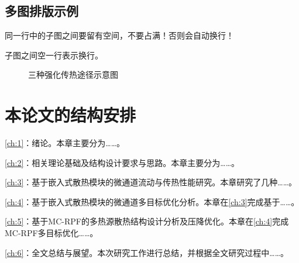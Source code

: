 \subsection{多图排版示例}
同一行中的子图之间要留有空间，不要占满！否则会自动换行！

子图之间空一行表示换行。

\begin{figure}[htb]

    \caption{三种强化传热途径示意图}
    \label{fig:Three-enhanced-heat-transfer-paths}
\end{figure}


\section{本论文的结构安排}
\cref{ch:1}：绪论。本章主要分为……。

\cref{ch:2}：相关理论基础及结构设计要求与思路。本章主要分为……。

\cref{ch:3}：基于嵌入式散热模块的微通道流动与传热性能研究。本章研究了几种……。

\cref{ch:4}：基于嵌入式散热模块的微通道多目标优化分析。本章在\cref{ch:3}完成基于……。

\cref{ch:5}：基于MC-RPF的多热源散热结构设计分析及压降优化。本章在\cref{ch:4}完成MC-RPF多目标优化……。

\cref{ch:6}：全文总结与展望。本次研究工作进行总结，并根据全文研究过程中……。


